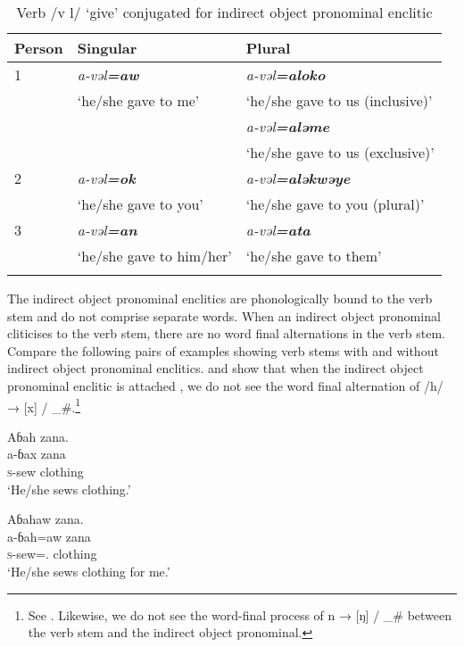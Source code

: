\begin{table}
\begin{tabular}{lll}
\lsptoprule
{Person} & {Singular} & {Plural}\\\midrule
{1} & \textit{a-vəl\textbf{=aw}}  & \textit{a-vəl}\textbf{\textit{=aloko}}\\
& ‘he/she gave to me’ & ‘he/she gave to us (inclusive)’\\
&  & \textit{a-vəl}\textbf{\textit{=aləme}}\\
& & ‘he/she gave to us (exclusive)’\\\midrule
{2} & \textit{a-vəl}\textbf{\textit{=ok}} & \textit{a-vəl}\textbf{\textit{=aləkwəye}}\\
& ‘he/she gave to you’ & ‘he/she gave to you (plural)’\\\midrule
{3} & \textit{a-vəl}\textbf{\textit{=an}} & \textit{a-vəl}\textbf{\textit{=ata}}\\
& ‘he/she gave to him/her’ & ‘he/she gave to them’\\
\lspbottomrule
\end{tabular}
\caption{Verb /v l/ ‘give’ conjugated for indirect object pronominal enclitic\label{tab:7.58}}
\end{table}

The indirect object pronominal enclitics are phonologically bound to the verb stem  and do not comprise separate words.  When an indirect object pronominal cliticises to the verb stem, there are no word final alternations in the verb stem. Compare the following pairs of examples showing verb stems with and without indirect object pronominal enclitics.  and  show that when the indirect object pronominal enclitic is attached , we do not see the word final alternation of /h/ → [x] / \_\#.\footnote{See . Likewise, we do not see the word-final process of n → [ŋ] /  \_\# between the verb stem and the indirect object pronominal.} 

\ea\label{ex:7:18}
Aɓah  zana.\\
\gll a-ɓax  zana\\
\textsc{s}-sew    clothing\\
\glt ‘He/she sews clothing.’
\z

\ea\label{ex:7:19}
Aɓahaw  zana.  \\
\gll a-ɓah=aw    zana  \\
\textsc{s}{}-sew={\oneS}.{\IO}   clothing    \\
\glt ‘He/she sews clothing for me.’
\z

